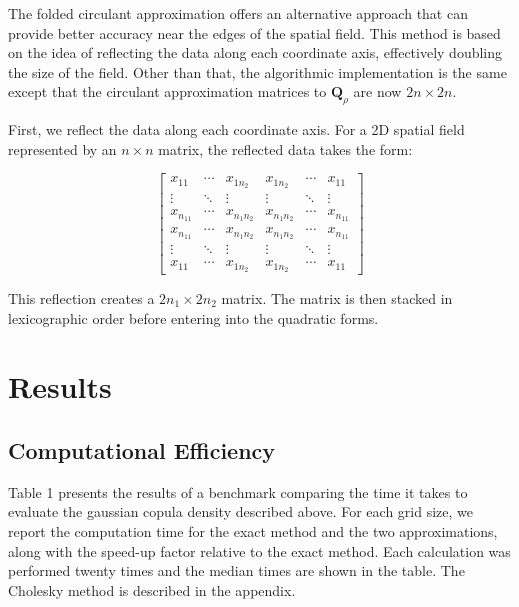 \documentclass[journal=,manuscript=]{achemso}
\begin{document}
The folded circulant approximation offers an alternative approach that
can provide better accuracy near the edges of the spatial field. This
method is based on the idea of reflecting the data along each coordinate
axis, effectively doubling the size of the field. Other than that, the
algorithmic implementation is the same except that the circulant
approximation matrices to \(\mathbf Q_{\rho}\) are now \(2n \times 2n\).

First, we reflect the data along each coordinate axis. For a 2D spatial
field represented by an \(n \times n\) matrix, the reflected data takes
the form:

\[
\begin{bmatrix}
x_{11} & \cdots & x_{1n_2} & x_{1n_2} & \cdots & x_{11} \\
\vdots & \ddots & \vdots & \vdots & \ddots & \vdots \\
x_{n_11} & \cdots & x_{n_1n_2} & x_{n_1n_2} & \cdots & x_{n_11} \\
x_{n_11} & \cdots & x_{n_1n_2} & x_{n_1n_2} & \cdots & x_{n_11} \\
\vdots & \ddots & \vdots & \vdots & \ddots & \vdots \\
x_{11} & \cdots & x_{1n_2} & x_{1n_2} & \cdots & x_{11}
\end{bmatrix}
\]

This reflection creates a \(2n_1 \times 2n_2\) matrix. The matrix is
then stacked in lexicographic order before entering into the quadratic
forms.

\section{Results}\label{results}

\subsection{Computational Efficiency}\label{computational-efficiency}

Table 1 presents the results of a benchmark comparing the time it takes
to evaluate the gaussian copula density described above. For each grid
size, we report the computation time for the exact method and the two
approximations, along with the speed-up factor relative to the exact
method. Each calculation was performed twenty times and the median times
are shown in the table. The Cholesky method is described in the
appendix.
\end{document}
